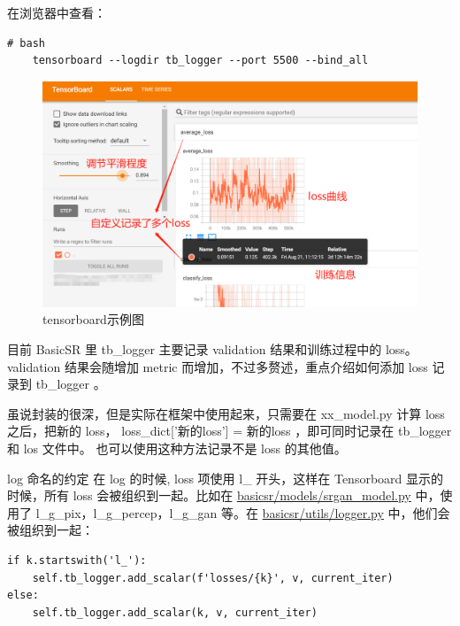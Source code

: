 \documentclass[../main.tex]{subfiles}
\begin{document}
在浏览器中查看：
\begin{verbatim}
# bash
    tensorboard --logdir tb_logger --port 5500 --bind_all
\end{verbatim}

\begin{figure}[h]
    \begin{center}
        \includegraphics[width=0.8\linewidth]{figures/tensorboard_demo.png}
        \caption{tensorboard示例图}
        \label{fig:tensorboard_demo}
    \end{center}
\end{figure}

目前 BasicSR 里 tb\_logger 主要记录 validation 结果和训练过程中的 loss。validation 结果会随增加 metric 而增加，不过多赘述，重点介绍如何添加 loss 记录到 tb\_logger 。

\begin{hl} %
    虽说封装的很深，但是实际在框架中使用起来，只需要在 xx\_model.py 计算 loss 之后，把新的 loss， loss\_dict['新的loss'] = 新的loss ，即可同时记录在 tb\_logger 和 los 文件中。
    也可以使用这种方法记录不是 loss 的其他值。
\end{hl}

\begin{exampleBox}[righthand ratio=0.00, sidebyside, sidebyside align=center, lower separated=false]{log 命名的约定}
在 log 的时候, loss 项使用 l\_ 开头，这样在 Tensorboard 显示的时候，所有 loss 会被组织到一起。比如在 \href{https://github.com/XPixelGroup/BasicSR/blob/master/basicsr/models/srgan_model.py}{basicsr/models/srgan\_model.py} 中，使用了 l\_g\_pix，l\_g\_percep，l\_g\_gan 等。在 \href{https://github.com/XPixelGroup/BasicSR/blob/master/basicsr/utils/logger.py}{basicsr/utils/logger.py} 中，他们会被组织到一起：
\begin{verbatim}
if k.startswith('l_'):
    self.tb_logger.add_scalar(f'losses/{k}', v, current_iter)
else:
    self.tb_logger.add_scalar(k, v, current_iter)
\end{verbatim}
\end{exampleBox}
\end{document}
